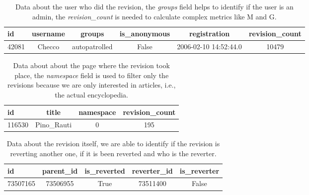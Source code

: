 \begin{table}[H]
    \centering
    \begin{tabularx}{\columnwidth}{@{}Xccccc@{}}
        \midrule
        \textbf{id} & \textbf{username} & \textbf{groups} & \textbf{is\_anonymous} & \textbf{registration} & \textbf{revision\_count}\\ \toprule
        42081 & Checco & autopatrolled & False & 2006-02-10 14:52:44.0 & 10479 \\

         \bottomrule
    \end{tabularx}
    
    \caption{Data about the user who did the revision, the   \textit{groups} field helps to
     identify if the user is an admin, the \textit{revision\_count} is needed to calculate complex metrics like M and G. \label{table:user}}
\end{table}


\begin{table}[H]
    \centering
    \begin{tabularx}{\columnwidth}{@{}Xccc@{}}
        \midrule
        \textbf{id} & \textbf{title} & \textbf{namespace} & \textbf{revision\_count} \\ \toprule
        116530 & Pino\_Rauti & 0 &  195 
        \\

         \bottomrule
    \end{tabularx}
    
    \caption{Data about about the page where the revision took place,  the \textit{namespace} field is used
    to filter only the revisions because we are only interested in articles, i.e., the actual encyclopedia. \label{table:page}}
\end{table}

\begin{table}[H]
    \centering
    \begin{tabularx}{\columnwidth}{@{}Xcccc@{}}
        \midrule
        \textbf{id} & \textbf{parent\_id} & \textbf{is\_reverted} & \textbf{reverter\_id} & \textbf{is\_reverter} \\ \toprule
        73507165 & 73506955 & True &  73511400 & False 
        \\

         \bottomrule
    \end{tabularx}
    
    \caption{Data about the revision itself, we are able to identify if the revision is reverting another
    one, if it is been reverted and who is the reverter. \label{table:revision} }
\end{table}


